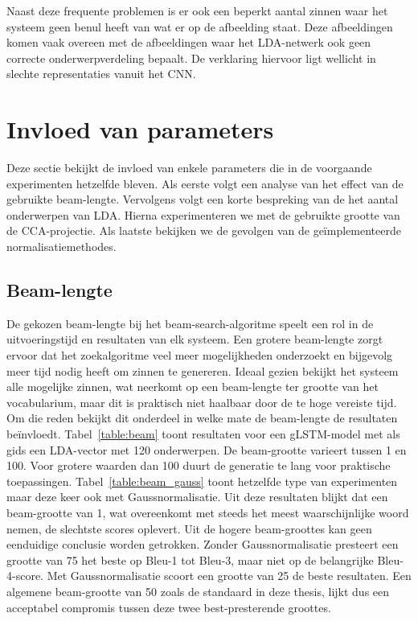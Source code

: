 Naast deze frequente problemen is er ook een beperkt aantal zinnen waar het systeem geen benul heeft van wat er op de afbeelding staat.
Deze afbeeldingen komen vaak overeen met de afbeeldingen waar het LDA-netwerk ook geen correcte onderwerpverdeling bepaalt.
De verklaring hiervoor ligt wellicht in slechte representaties vanuit het CNN.
    
\section{Invloed van parameters}
\label{sec:invloed-parameters}
Deze sectie bekijkt de invloed van enkele parameters die in de voorgaande experimenten hetzelfde bleven. Als eerste volgt een analyse van het effect van de gebruikte beam-lengte. Vervolgens volgt een korte bespreking van de het aantal onderwerpen van LDA. Hierna experimenteren we met de gebruikte grootte van de CCA-projectie. Als laatste bekijken we de gevolgen van de ge\"implementeerde normalisatiemethodes.

\subsection{Beam-lengte}
De gekozen beam-lengte bij het beam-search-algoritme speelt een rol in de uitvoeringstijd en resultaten van elk systeem. 
Een grotere beam-lengte zorgt ervoor dat het zoekalgoritme veel meer mogelijkheden onderzoekt en bijgevolg meer tijd nodig heeft om zinnen te genereren.
Ideaal gezien bekijkt het systeem alle mogelijke zinnen, wat neerkomt op een beam-lengte ter grootte van het vocabularium, maar dit is praktisch niet haalbaar door de te hoge vereiste tijd.
Om die reden bekijkt dit onderdeel in welke mate de beam-lengte de resultaten be\"invloedt.
Tabel~\ref{table:beam} toont resultaten voor een gLSTM-model met als gids een LDA-vector met 120 onderwerpen. De beam-grootte varieert tussen 1 en 100. Voor grotere waarden dan 100 duurt de generatie te lang voor praktische toepassingen. Tabel~\ref{table:beam_gauss} toont hetzelfde type van experimenten maar deze keer ook met Gaussnormalisatie. Uit deze resultaten blijkt dat een beam-grootte van 1, wat overeenkomt met steeds het meest waarschijnlijke woord nemen, de slechtste scores oplevert. Uit de hogere beam-groottes kan geen eenduidige conclusie worden getrokken. Zonder Gaussnormalisatie presteert een grootte van 75 het beste op Bleu-1 tot Bleu-3, maar niet op de belangrijke Bleu-4-score. Met Gaussnormalisatie scoort een grootte van 25 de beste resultaten. Een algemene beam-grootte van 50 zoals de standaard in deze thesis, lijkt dus een acceptabel compromis tussen deze twee best-presterende groottes.

